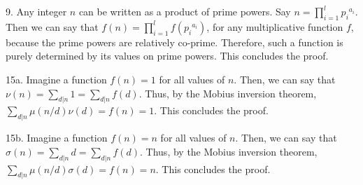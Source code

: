 \documentclass{article}
\begin{document}
9. Any integer $n$ can be written as a product of prime powers. Say $n = \prod_{i = 1}^l {p_i}^{a_i}$. Then we can say that $f(n) = \prod_{i = 1}^l f({p_i}^{a_i})$, for any multiplicative function $f$, because the prime powers are relatively co-prime. Therefore, such a function is purely determined by its values on prime powers. This concludes the proof.

15a. Imagine a function $f(n) = 1$ for all values of $n$. Then, we can say that $\nu(n) = \sum_{d | n} 1 = \sum_{d | n} f(d)$. Thus, by the Mobius inversion theorem, $\sum_{d | n} \mu(n/d)\nu(d) = f(n) = 1$. This concludes the proof. 

15b. Imagine a function $f(n) = n$ for all values of $n$. Then, we can say that $\sigma(n) = \sum_{d | n} d = \sum_{d | n} f(d)$. Thus, by the Mobius inversion theorem, $\sum_{d | n} \mu(n/d)\sigma(d) = f(n) = n$. This concludes the proof.
\end{document}
